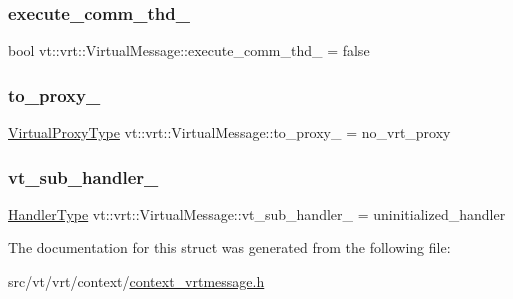 \subsubsection{\texorpdfstring{execute\+\_\+comm\+\_\+thd\+\_\+}{execute\_comm\_thd\_}}
{\footnotesize\ttfamily bool vt\+::vrt\+::\+Virtual\+Message\+::execute\+\_\+comm\+\_\+thd\+\_\+ = false\hspace{0.3cm}{\ttfamily [private]}}

\mbox{\label{structvt_1_1vrt_1_1_virtual_message_a4a5e7604c7191fc8d94dac4a973aad8c}} 
\subsubsection{\texorpdfstring{to\+\_\+proxy\+\_\+}{to\_proxy\_}}
{\footnotesize\ttfamily \hyperlink{namespacevt_a1b417dd5d684f045bb58a0ede70045ac}{Virtual\+Proxy\+Type} vt\+::vrt\+::\+Virtual\+Message\+::to\+\_\+proxy\+\_\+ = no\+\_\+vrt\+\_\+proxy\hspace{0.3cm}{\ttfamily [private]}}

\mbox{\label{structvt_1_1vrt_1_1_virtual_message_a9fe6bc641b3cd85c47faaf2cc6883d2a}} 
\subsubsection{\texorpdfstring{vt\+\_\+sub\+\_\+handler\+\_\+}{vt\_sub\_handler\_}}
{\footnotesize\ttfamily \hyperlink{namespacevt_af64846b57dfcaf104da3ef6967917573}{Handler\+Type} vt\+::vrt\+::\+Virtual\+Message\+::vt\+\_\+sub\+\_\+handler\+\_\+ = uninitialized\+\_\+handler\hspace{0.3cm}{\ttfamily [private]}}



The documentation for this struct was generated from the following file\+:\begin{DoxyCompactItemize}
\item 
src/vt/vrt/context/\hyperlink{context__vrtmessage_8h}{context\+\_\+vrtmessage.\+h}\end{DoxyCompactItemize}
